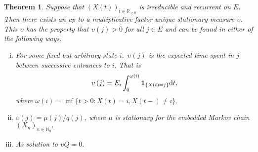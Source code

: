 \documentclass[12pt,a4paper]{scrartcl}
\newtheorem{theorem}{Theorem}[section]
\numberwithin{equation}{section}
\newcommand{\R}{\mathbb{R}} %
\newcommand{\N}{\mathbb{N}} %
\begin{document}
\begin{theorem}
\label{stationarymeasuretheorem}
Suppose that $\left(X\left(t\right)\right)_{t \in \R_{\geq 0}}$ is irreducible and recurrent on $E$. Then there exists an up to a multiplicative factor unique stationary measure $\upsilon$. This $\upsilon$ has the property that $ \upsilon\left(j\right) > 0 $ for all $ j \in E $ and can be found in either of the following ways:
\begin{enumerate}[(i)]
\item \label{stationaryfirst} For some fixed but arbitrary state $i,$ $\upsilon\left(j\right)$ is the expected time spent in $j$ between successive entrances to $i.$ That is
\begin{equation}
\upsilon\left(j\right) = E_i \int_0^{\omega\left(i\right)} \textbf{1}_{\lbrace X\left(t\right) = j \rbrace} \textnormal{d}t,
\end{equation}
where $\omega\left(i\right) = \inf\lbrace t > 0: X\left(t\right) = i, X\left(t-\right) \neq i \rbrace.$
\item \label{stationarysecond} $\upsilon\left(j\right) = \mu\left(j\right)/ q\left(j\right) $, where $ \mu $ is stationary for the embedded Markov chain $ \left(X_n\right)_{n \in \N_0}. $
\item \label{stationarythird} As solution to $\upsilon Q = 0.$
\end{enumerate}
\end{theorem}
\end{document}
